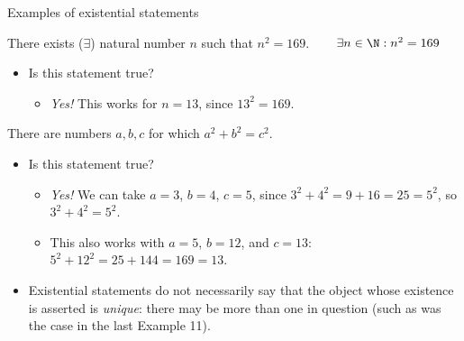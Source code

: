 \documentclass[11pt,aspectratio=1610]{beamer}
\begin{document}
		
		\begin{frame}{Examples of existential statements}
			\p
			\begin{examplen}
				There exists ($\exists$) natural number $n$ such that $n^2 = 169$. ~~~ $\exists n\in \N : n^2=169$
			\end{examplen}
			\p
			\begin{itemize}
				\item Is this statement true? \p
				\begin{itemize}
					\item \emph{Yes!} This works for $n=13$, since $13^2 = 169$. \p
				\end{itemize}\p
			\end{itemize}
			\begin{examplen}
				There are numbers $a, b, c$ for which $a^2 + b^2 = c^2$. 
			\end{examplen}\p
			\begin{itemize}
				\item Is this statement true? \p
				\begin{itemize}
					\item \emph{Yes!} We can take $a=3$, $b=4$, $c=5$, since $3^2 + 4^2 = 9 + 16 = 25 = 5^2$, so $3^2 + 4^2 = 5^2$. \p
					\item This also works with $a=5$, $b=12$, and $c=13$: $5^2 + 12^2 = 25 + 144 = 169 = 13$. \p
				\end{itemize}
				\item Existential statements do not necessarily say that the object whose existence is asserted is \emph{unique}: there may be more than one in question (such as was the case in the last Example 11). 
			\end{itemize}
		\end{frame}
		
\end{document}
